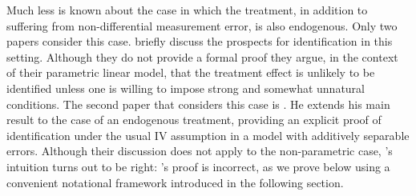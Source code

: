 

Much less is known about the case in which the treatment, in addition to suffering from non-differential measurement error, is also endogenous.
Only two papers consider this case.
\cite{FL} briefly discuss the prospects for identification in this setting.
Although they do not provide a formal proof they argue, in the context of their parametric linear model, that the treatment effect is unlikely to be identified unless one is willing to impose strong and somewhat unnatural conditions. 
The second paper that considers this case is \cite{Mahajan}.
He extends his main result to the case of an endogenous treatment, providing an explicit proof of identification under the usual IV assumption in a model with additively separable errors.
Although their discussion does not apply to the non-parametric case, \citeauthor{FL}'s intuition turns out to be right: \citeauthor{Mahajan}'s proof is incorrect, as we prove below using a convenient notational framework introduced in the following section.
